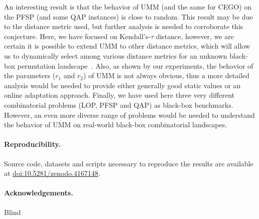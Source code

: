 \documentclass[runningheads]{llncs}
\newcommand{\supplement}{\href{http://doi.org/10.5281/zenodo.4167148}{doi:10.5281/zenodo.4167148}}
\begin{document}
An interesting result is that the behavior of UMM (and the same for CEGO) on
the PFSP (and some QAP instances) is close to random. %
This result may be due to the distance
metric used, but further analysis is needed to corroborate this
conjecture. Here, we have focused on Kendall's-$\tau$ distance, however, we are certain it is
possible to extend UMM to other distance metrics, which will allow us to
dynamically select among various distance metrics for an unknown black-box
permutation landscape~\citep{ZaeStoBar2014:ppsn}. Also, as shown by our
experiments, the behavior of the parameters ($r_1$ and $r_2$) of UMM is not
always obvious, thus a more detailed analysis would be needed to provide either
generally good static values or an online adaptation approach. Finally, we have
used here three very different combinatorial problems (LOP, PFSP and QAP) as
black-box benchmarks. However, an even more diverse range of problems would be
needed to understand the behavior of UMM on real-world black-box combinatorial
landscapes.




\begin{smaller}
  \paragraph*{Reproducibility.} Source code, datasets and scripts necessary to reproduce the results are available at \supplement.
  \vspace*{-1em}
\paragraph*{Acknowledgements.} Blind
%

\end{smaller}



\renewcommand{\doi}[1]{doi:\hspace{.16667em plus .08333em}\discretionary{}{}{}\href{https://doi.org/#1}{\urlstyle{rm}\nolinkurl{#1}}}

\end{document}

